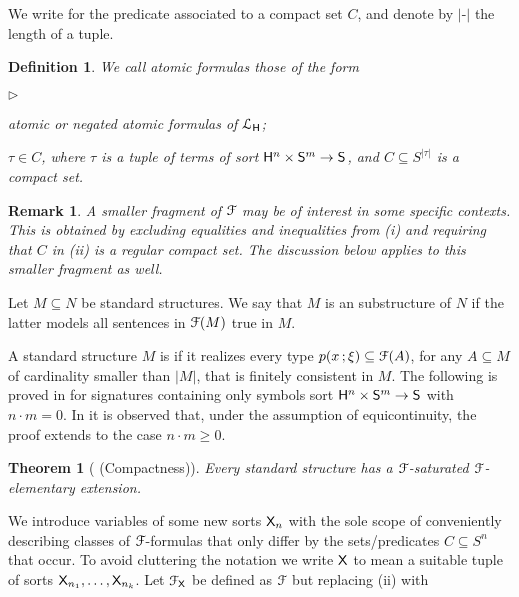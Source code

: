 \documentclass{amsproc}
\newcommand{\mylabel}[1]{{#1}\hfill}
\renewenvironment{itemize}
  {\begin{list}{$\triangleright$}{%
  \setlength{\parskip}{0mm}
  \setlength{\topsep}{.1\baselineskip}
  \setlength{\rightmargin}{0mm}
  \setlength{\listparindent}{0mm}
  \setlength{\itemindent}{0mm}
  \setlength{\labelwidth}{3ex}
  \setlength{\itemsep}{.1\baselineskip}
  \setlength{\parsep}{.1\baselineskip}
  \setlength{\partopsep}{0mm}
  \setlength{\labelsep}{1ex}
  \setlength{\leftmargin}{\labelwidth+\labelsep}
  \let\makelabel\mylabel}}{%
\end{list}}
\newcounter{thm}
\theoremstyle{mio}
\newtheorem{theorem}[thm]{Theorem}\tcolorboxenvironment{theorem}{mythm}
\newtheorem{definition}[thm]{Definition}\tcolorboxenvironment{definition}{mythm}
\newtheorem{remark}[thm]{Remark}\tcolorboxenvironment{remark}{mythm}
\renewcommand*{\emph}[1]{%
   \smash{\tikz[baseline]\node[rectangle, fill=teal!25, rounded corners, inner xsep=0.5ex, inner ysep=0.2ex, anchor=base, minimum height = 2.7ex]{\strut #1};}}
\begin{document}
We write \emph{$x\in C$\/} for the predicate associated to a compact set $C$, and denote by $|\mbox{-}|$ the length of a tuple.

\begin{definition}
  We call atomic formulas those of the form
  \begin{itemize}
  \item[i.] atomic or negated atomic formulas of ${\EuScript L}_{\sf H}$;
  \item[ii.] $\tau\in C$, where $\tau$ is a tuple of terms of sort ${\sf H}^n\times {\sf S}^m\to {\sf S}$, and $C\subseteq S^{|\tau|}$ is a compact set.
  \end{itemize}
\end{definition}

\begin{remark}
  A smaller fragment of ${\EuScript F}$ may be of interest in some specific contexts.
  This is obtained by excluding equalities and inequalities from (i) and requiring that $C$ in (ii) is a regular compact set.
  The discussion below applies to this smaller fragment as well.
\end{remark}

 Let $M\subseteq N$ be standard structures.
 We say that $M$ is an \emph{${\EuScript F}$-elementary\/} substructure of $N$ if the latter models all sentences in ${\EuScript F}(M)$ true in $M$.

 A standard structure $M$ is \emph{${\EuScript F}$-saturated\/} if it realizes every type $p(x\,;\xi)\subseteq{\EuScript F}(A)$, for any $A\subseteq M$ of cardinality smaller than $|M|$, that is finitely consistent in $M$.
 The following is proved in \cite{clcl} for signatures containing only symbols sort ${\sf H}^n\times{\sf S}^m\to {\sf S}$ with $n{\cdot}m=0$.
 In \cite{Z} it is observed that, under the assumption of equicontinuity, the proof extends to the case $n{\cdot}m\geq 0$.
\begin{theorem}[ (Compactness)]%
  Every standard structure has a ${\EuScript F}$-saturated ${\EuScript F}$-elementary extension.
\end{theorem}

We introduce variables of some new sorts ${\sf X}_n$ with the sole scope of conveniently describing classes of ${\EuScript F}$-formulas that only differ by the sets/predicates $C\subseteq S^n$ that occur.
To avoid cluttering the notation we write ${\sf X}$ to mean a suitable tuple of sorts ${\sf X}_{n_1},\dots,{\sf X}_{n_k}$.
Let ${\EuScript F}_{\sf X}$ be defined as ${\EuScript F}$ but replacing (ii) with\smallskip
\end{document}
